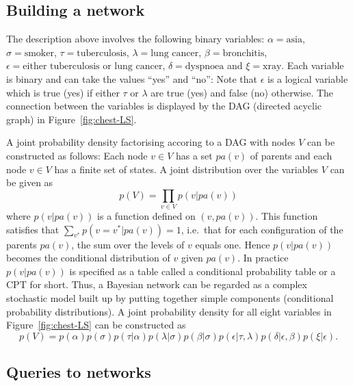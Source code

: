 \documentclass[10pt]{article}\usepackage[]{graphicx}\usepackage[]{color}
\begin{document}
\subsection{Building a network}

The description above involves the following binary variables:
$\alpha=\mbox{asia}$,
$\sigma=\mbox{smoker}$,
$\tau=\mbox{tuberculosis}$,
$\lambda=\mbox{lung cancer}$,
$\beta=\mbox{bronchitis}$,
$\epsilon=\mbox{either tuberculosis or lung cancer}$,
$\delta=\mbox{dyspnoea}$ and
$\xi=\mbox{xray}$. 
Each variable is binary and can take the values ``yes'' and ``no'':
Note that $\epsilon$ is a logical variable which is
true (yes) if either $\tau$ or $\lambda$ are true (yes) and false (no) otherwise.
The connection between the variables is displayed by the DAG (directed acyclic graph) in
Figure~\ref{fig:chest-LS}.

A joint probability density factorising accoring to a DAG with nodes
$V$ can be constructed as follows: Each node $v\in V$ has a set $pa(v)$ of parents and each node
$v\in V$ has a finite set of states. A joint distribution
over the variables $V$ can be given as
\begin{equation}
  \label{eq:dagfact1}
  p(V) = \prod_{v\in V} p(v|pa(v))
\end{equation}
where $p(v|pa(v))$ is a function defined on $(v,pa(v))$. This function
satisfies that $\sum_{v^*} p(v=v^*|pa(v))=1$, i.e.\ that
for each configuration of the parents $pa(v)$, the sum
over the levels of $v$ equals one. Hence $p(v|pa(v))$ becomes the
conditional distribution of $v$ given $pa(v)$.
In practice $p(v|pa(v))$ is specified as a table called a conditional
probability table or a CPT for short.
Thus, a Bayesian network can be regarded as a complex stochastic model built up by
putting together simple components (conditional probability
distributions).
A joint probability density for all eight variables in
Figure~\ref{fig:chest-LS}
can be constructed as 
\begin{equation}
  \label{eq:chestfact1}
  p(V) =
  p(\alpha)p(\sigma)p(\tau|\alpha)p(\lambda|\sigma)p(\beta|\sigma)p(\epsilon|\tau,\lambda)
  p(\delta|\epsilon, \beta)p(\xi|\epsilon).
\end{equation}



\subsection{Queries to networks}
\label{sec:xxx}
\end{document}
